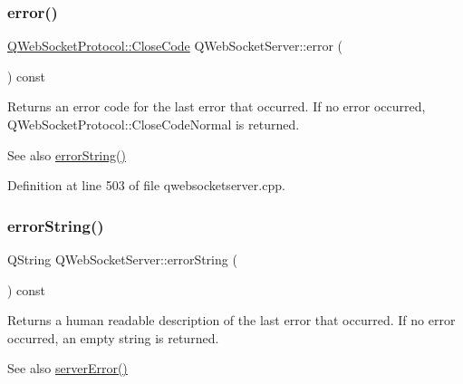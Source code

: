 \mbox{\label{class_q_web_socket_server_ad7db68dd641e6a5ff0c40b8b4788e1fc}} 
\subsubsection{\texorpdfstring{error()}{error()}}
{\footnotesize\ttfamily \mbox{\hyperlink{namespace_q_web_socket_protocol_a9f236676f594451d8d723f260b71028c}{Q\+Web\+Socket\+Protocol\+::\+Close\+Code}} Q\+Web\+Socket\+Server\+::error (\begin{DoxyParamCaption}{ }\end{DoxyParamCaption}) const}

Returns an error code for the last error that occurred. If no error occurred, Q\+Web\+Socket\+Protocol\+::\+Close\+Code\+Normal is returned.

\begin{DoxySeeAlso}{See also}
\mbox{\hyperlink{class_q_web_socket_server_a7c86fee3522b6ba2aad22418fbace5bd}{error\+String()}} 
\end{DoxySeeAlso}


Definition at line 503 of file qwebsocketserver.\+cpp.

\mbox{\label{class_q_web_socket_server_a7c86fee3522b6ba2aad22418fbace5bd}} 
\subsubsection{\texorpdfstring{error\+String()}{errorString()}}
{\footnotesize\ttfamily Q\+String Q\+Web\+Socket\+Server\+::error\+String (\begin{DoxyParamCaption}{ }\end{DoxyParamCaption}) const}

Returns a human readable description of the last error that occurred. If no error occurred, an empty string is returned.

\begin{DoxySeeAlso}{See also}
\mbox{\hyperlink{class_q_web_socket_server_ae0252a3e66f2f1c7e80b99508390df24}{server\+Error()}} 
\end{DoxySeeAlso}


